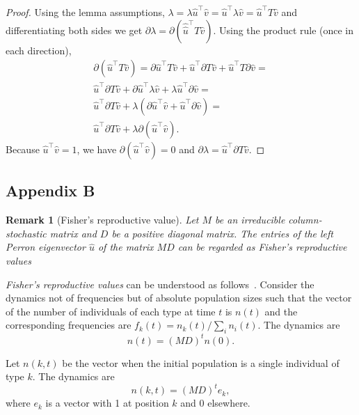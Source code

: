 \documentclass[12pt, twocolumn]{extarticle}
\newcommand*{\tr}{^\intercal}
\newtheorem{remark}{Remark}
\begin{document}
\begin{proof} 
Using the lemma assumptions,
$\lambda = \lambda \hat u\tr \hat v = \hat u\tr \lambda \hat v = \hat u\tr T \hat v$ and differentiating both sides we get $\partial \lambda = \partial (\hat \hat u\tr T \hat v)$.
Using the product rule (once in each direction),
\begin{equation}
\begin{aligned}
\partial (\hat u\tr T \hat v) = 
\partial \hat u\tr T \hat v + \hat u\tr \partial T \hat v + \hat u\tr T \partial \hat v = \\
\hat u\tr \partial T \hat v + \partial \hat u\tr \lambda \hat v  + \lambda \hat u\tr \partial \hat v = \\
\hat u\tr \partial T \hat v + \lambda(\partial \hat u\tr \hat v  + \hat u\tr \partial \hat v) = \\
\hat u\tr \partial T \hat v + \lambda \partial(\hat u\tr \hat v).
\end{aligned}
\end{equation}
Because $\hat u\tr \hat v = 1$,
we have $\partial (\hat u\tr \hat v) = 0$ and
$\partial \lambda = \hat u\tr \partial T \hat v$.
\end{proof}

\subsection*{Appendix B}\label{sec:AppB}
\begin{remark}[Fisher's reproductive value]
Let $M$ be an irreducible column-stochastic matrix and $D$ be a positive diagonal matrix. 
The entries of the left \emph{Perron} eigenvector $\hat u$ of the matrix $MD$ can be regarded as \emph{Fisher's reproductive values}~\citep[pg.~27]{Fisher1930}
\end{remark}

\emph{Fisher's reproductive values} can be understood as follows~\citep[ch.~10]{Grafen2006,Otto2007}.
Consider the dynamics not of frequencies but of absolute population sizes such that the vector of the number of individuals of each type at time $t$ is $n(t)$ and the corresponding frequencies are $f_k(t) = n_k(t) / \sum_i{n_i(t)}$.
The dynamics are
\begin{equation}
n(t) = (MD)^t n(0).
\end{equation}

Let $n(k, t)$ be the vector when the initial population is a single individual of type $k$.
The dynamics are
\begin{equation}
n(k,t) = (MD)^t e_k,
\end{equation}
where $e_k$ is a vector with 1 at position $k$ and 0 elsewhere.
\end{document}
